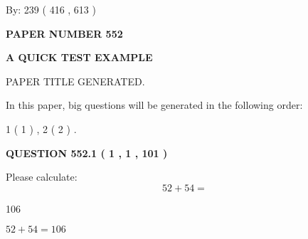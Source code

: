 \documentclass[12pt]{article}
\begin{document}
   
\hspace{1.0in} By: 
 239 ( 416 ,  613 )
   
   
   
   
\newpage 
\setcounter{page}{ 
   552001 } 
   
   
   
   
 {\textbf{ \Large{ PAPER NUMBER  552  }}}
   
   
\vspace{0.2in}
   
   
   
   
   
   
   
   
 \vspace{0.2in}
{\LARGE {\textbf{ A QUICK TEST EXAMPLE}}}
   
   
 PAPER TITLE GENERATED.
   
   
   
\vspace{0.2in}
   
In this paper, big questions will be generated in the following order: 
   
   
   1 ( 1 )
 ,
   2 ( 2 )
 .
  
\vspace{0.2in}
  
{\textbf{\Large{QUESTION
552.1 
 ( 1 , 1 , 101 )
}}}
  
  
 
Please calculate:
\begin{equation}
52 +  %
54 = \nonumber
\end{equation}
 
 
 
\noindent{}
 
 

106
 
 
\noindent{}
 
 

 
 
 
\noindent{}
 
 

$ %
52 +  %
54=   %
106$
 
 
\noindent{}
 
\end{document}
